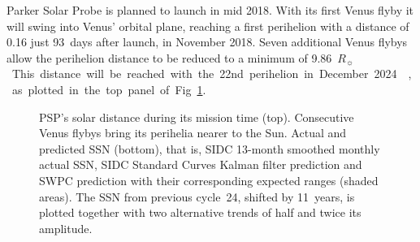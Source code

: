 \documentclass[]{aa}
\newcommand{\Rs}{$R_\sun{}$}
\begin{document}
        Parker Solar Probe is planned to launch in mid 2018. With its first Venus flyby it will swing into Venus' orbital plane, reaching  a first perihelion with a distance of \SI{0.16}{\au  } just 93~days
after launch, in November 2018. Seven additional Venus flybys allow the perihelion distance to be reduced to a minimum of \SI{9.86}{\Rs}. This distance will be reached with the 22nd perihelion in December 2024 \citep{Fox2015}, as plotted in the top panel of Fig.~\ref{fig:SPP_orbit_predicted_SSN_overview_f_plot}.
        \begin{figure}
                \caption{PSP's solar distance during its mission time (top). Consecutive Venus flybys bring its perihelia nearer to the Sun. Actual and predicted SSN (bottom), that is, SIDC 13-month smoothed monthly actual SSN, SIDC Standard Curves Kalman filter prediction and SWPC prediction with their corresponding expected ranges (shaded areas). The SSN from previous cycle~24, shifted by 11~years, is plotted together with two alternative trends of half and twice its amplitude.}
                \label{fig:SPP_orbit_predicted_SSN_overview_f_plot}
        \end{figure}
\end{document}

